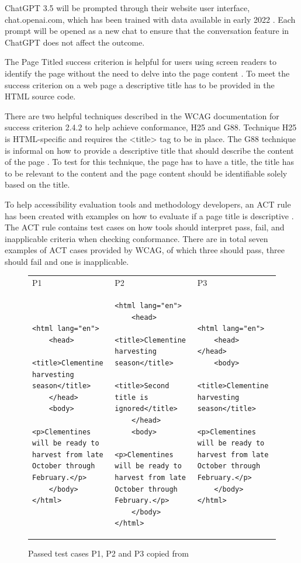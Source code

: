 ChatGPT 3.5 will be prompted through their website user interface, chat.openai.com, which has been trained with data available in early 2022 \citep{openai_35}. Each prompt will be opened as a new chat to ensure that the conversation feature in ChatGPT does not affect the outcome.

The Page Titled success criterion is helpful for users using screen readers to identify the page without the need to delve into the page content \citep{wcag_page_titled}. To meet the success criterion on a web page a descriptive title has to be provided in the HTML source code. 

There are two helpful techniques described in the WCAG documentation for success criterion 2.4.2 to help achieve conformance, H25 and G88. Technique H25 is HTML-specific and requires the <title> tag to be in place. The G88 technique is informal on how to provide a descriptive title that should describe the content of the page \citep{g88}. To test for this technique, the page has to have a title, the title has to be relevant to the content and the page content should be identifiable solely based on the title.

To help accessibility evaluation tools and methodology developers, an ACT rule has been created with examples on how to evaluate if a page title is descriptive \citep{act_rule_g88}. The ACT rule contains test cases on how tools should interpret pass, fail, and inapplicable criteria when checking conformance. There are in total seven examples of ACT cases provided by WCAG, of which three should pass, three should fail and one is inapplicable.

\begin{figure}[htbp]
\caption{Passed test cases P1, P2 and P3 copied from \textcite{act_rule_g88}}
\label{passed_cases}
\begin{tabular}{|p{4.9cm}|p{4.9cm}|p{4.9cm}|}
P1 & P2 & P3 \\
\begin{lstlisting}
<html lang="en">
	<head>
		<title>Clementine harvesting season</title>
	</head>
	<body>
		<p>Clementines will be ready to harvest from late October through February.</p>
	</body>
</html>
\end{lstlisting}&
\begin{lstlisting}
<html lang="en">
	<head>
		<title>Clementine harvesting season</title>
		<title>Second title is ignored</title>
	</head>
	<body>
		<p>Clementines will be ready to harvest from late October through February.</p>
	</body>
</html>
\end{lstlisting}&
\begin{lstlisting}
<html lang="en">
	<head> </head>
	<body>
		<title>Clementine harvesting season</title>
		<p>Clementines will be ready to harvest from late October through February.</p>
	</body>
</html>
\end{lstlisting}
\end{tabular}
\end{figure}

